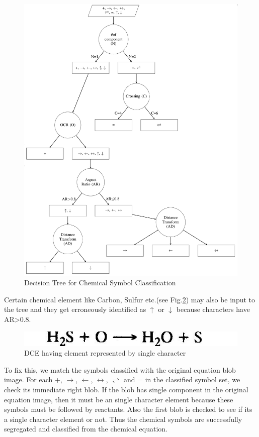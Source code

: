 \documentclass[conference]{IEEEtran}
\begin{document}
\begin{figure}[h!]
\centering 
\includegraphics[width=0.95\linewidth]{decision_tree}
\caption{Decision Tree for Chemical Symbol Classification}
\label{fig:decision_tree}
\end{figure}

Certain chemical element like Carbon, Sulfur etc.(see Fig.\ref{fig:single_char_element}) may also be input to the tree and they get erroneously identified as $\uparrow$ or $\downarrow$ because characters have AR\textgreater0.8.
 
\begin{figure}[h!]
\centering
\includegraphics[width=0.9\linewidth]{single_char_element} 
\caption{DCE having element represented by single character}
\label{fig:single_char_element}
\end{figure}

To fix this, we match the symbols classified with the original equation blob image. For each +, $\rightarrow$,  $\leftarrow$, $\leftrightarrow$,  $\rightleftharpoons$ and = in the classified symbol set, we check its immediate right blob. If the blob has single component in the original equation image, then it must be an single character element because these symbols must be followed by reactants. Also the first blob is checked to see if its a single character element or not. 
Thus the chemical symbols are successfully segregated and classified from the chemical equation.
   
\end{document}
